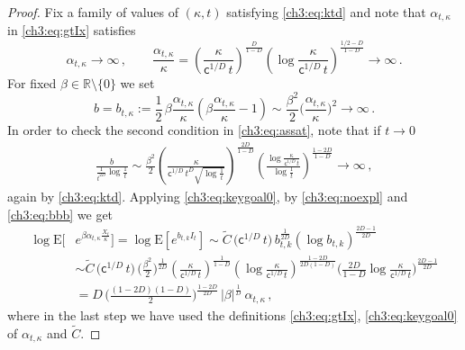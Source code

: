 \documentclass[a4paper,reqno,11pt]{amsart}
\numberwithin{equation}{section}
\renewcommand{\tilde}{\widetilde}          %
\newcommand{\R}{\mathbb{R}}
\newcommand{\PEfont}{\mathrm}
\newcommand{\E}{\ensuremath{\PEfont E}}
\newcommand\sfc{\mathsf{c}}
\begin{document}
\begin{proof}
Fix a family of values of $(\kappa,t)$ 
satisfying \eqref{ch3:eq:ktd} and note that $\alpha_{t,\kappa}$
in \eqref{ch3:eq:gtIx} satisfies
\begin{equation*}
	\alpha_{t,\kappa} \to \infty \,, \qquad
	\frac{\alpha_{t,\kappa}}{\kappa}
	= \left( \frac{\kappa}{ \sfc^{1/D} \, t}\right)^{\frac{D}{1-D}}
 \left(\log \frac{\kappa}{ \sfc^{1/D} \, t}\right)^{\frac{1/2-D}{1-D}} \to \infty \,.
\end{equation*}
For fixed $\beta \in\R \setminus \{0\}$ we set
\begin{equation}\label{ch3:eq:bbb}
	 b = b_{t,\kappa}:= \frac{1}{2} \, \beta\frac{\alpha_{t,\kappa}}{\kappa}
 \left(\beta\frac{\alpha_{t,\kappa}}{\kappa}-1\right)
 \sim \frac{\beta^2}{2} \bigg(\frac{\alpha_{t,\kappa}}{\kappa}\bigg)^2 \to \infty \,.
\end{equation}
In order to check the second condition in \eqref{ch3:eq:assat}, note that if $t \to 0$
\begin{equation*}
 \begin{split}
 \frac{b}{\frac{1}{t^{2D}}\log \frac{1}{t}} \sim
 \frac{\beta^2}{2}\left( \frac{\kappa}{ \sfc^{1/D} \, t^D \sqrt{\log\frac{1}{t}}}\right)
 ^{\frac{2D}{1-D}}
 \left(\frac{\log \frac{\kappa}{ \sfc^{1/D} \, t}}{\log \frac{1}{t}} \right)^{\frac{1-2D}{1-D}}
 \to \infty \,,
 \end{split}
\end{equation*}
again by \eqref{ch3:eq:ktd}.
Applying \eqref{ch3:eq:keygoal0}, by \eqref{ch3:eq:noexpl} and \eqref{ch3:eq:bbb} we get
\begin{equation*}
\begin{split}
\log \E\big[ & e^{\beta \alpha_{t,\kappa} \frac{X_t}{\kappa}} \big] =
	\log \E[e^{b_{t,k} I_t}] \sim 
	\tilde C\, \big(  \sfc^{1/D} \, t\big) 
	\, b_{t,k}^{\frac{1}{2D}}(\log b_{t,k})^{\frac{2D-1}{2D}} \\
	&\sim \tilde C \,
	\big( \sfc^{1/D} \,  t \big) \, \bigg(\frac{\beta^2}{2}\bigg)^{\frac{1}{2D}}
	\left( \frac{\kappa}{ \sfc^{1/D} \, t}\right)^{\frac{1}{1-D}}
 \left(\log \frac{\kappa}{ \sfc^{1/D} \, t}\right)^{\frac{1-2D}{2D(1-D)}}
  \bigg(\frac{2D}{1-D}\log \frac{\kappa}{ \sfc^{1/D} \, t} \bigg)^{\frac{2D-1}{2D}}
	\\
	& = 
	D \, \bigg(\frac{
	(1-2D) (1-D)}{2}\bigg)^{\frac{1-2D}{2D}} \,
	|\beta|^{\frac{1}{D}} \,
	\alpha_{t,\kappa} \,,
\end{split}
\end{equation*}
where in the last step we have used the definitions \eqref{ch3:eq:gtIx},
\eqref{ch3:eq:keygoal0} of $\alpha_{t,\kappa}$ and $\tilde C$.


\end{proof}
\end{document}
